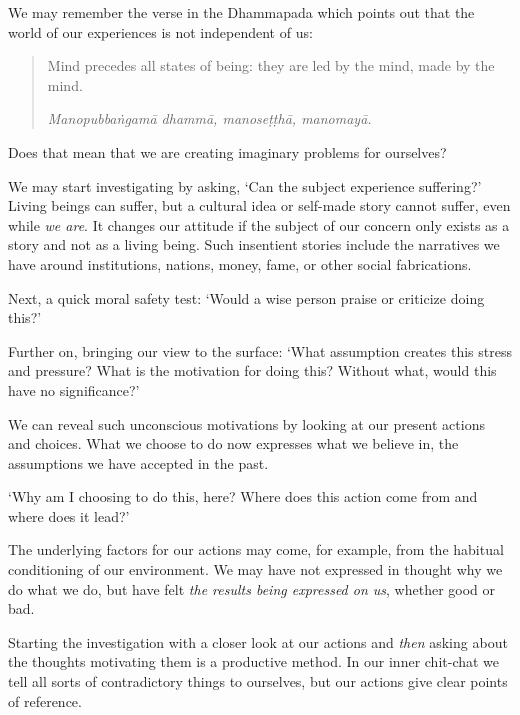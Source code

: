 \noindent We may remember the verse in the Dhammapada which points out
that the world of our experiences is not independent of us:

\begin{quote}
Mind precedes all states of being: they are led by the mind, made by the
mind.

\emph{Manopubbaṅgamā dhammā, manoseṭṭhā, manomayā.}

\bigskip

\end{quote}

Does that mean that we are creating imaginary problems for ourselves?

We may start investigating by asking, `Can the subject experience
suffering?' Living beings can suffer, but a cultural idea or self-made
story cannot suffer, even while \emph{we are}. It changes our attitude
if the subject of our concern only exists as a story and not as a living
being. Such insentient stories include the narratives we have around
institutions, nations, money, fame, or other social fabrications.

Next, a quick moral safety test: `Would a wise person praise or
criticize doing this?'

Further on, bringing our view to the surface: `What assumption creates
this stress and pressure? What is the motivation for doing this? Without
what, would this have no significance?'

We can reveal such unconscious motivations by looking at our present
actions and choices. What we choose to do now expresses what we believe
in, the assumptions we have accepted in the past.

`Why am I choosing to do this, here? Where does this action come from
and where does it lead?'

The underlying factors for our actions may come, for example, from the
habitual conditioning of our environment. We may have not expressed in
thought why we do what we do, but have felt \emph{the results being
expressed on us}, whether good or bad.

Starting the investigation with a closer look at our actions and
\emph{then} asking about the thoughts motivating them is a productive
method. In our inner chit-chat we tell all sorts of contradictory things
to ourselves, but our actions give clear points of reference.

